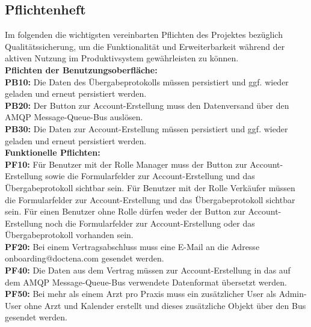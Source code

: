 \subsection{Pflichtenheft}
\label{sec:Pflichtenheft}
Im folgenden die wichtigsten vereinbarten Pflichten des Projektes bezüglich Qualitätssicherung, um die Funktionalität und Erweiterbarkeit während der aktiven Nutzung im Produktivsystem gewährleisten zu können.\\[1.5ex]
\textbf{Pflichten der Benutzungsoberfläche:}\\[1.5ex]
\textbf{PB10:} Die Daten des Übergabeprotokolls müssen persistiert und ggf. wieder geladen und erneut persistiert werden.\\
\textbf{PB20:} Der Button zur Account-Erstellung muss den Datenversand über den \ac{AMQP} Message-Queue-Bus auslösen.\\
\textbf{PB30:} Die Daten zur Account-Erstellung müssen persistiert und ggf. wieder geladen und erneut persistiert werden.\\[1.5ex]
\textbf{Funktionelle Pflichten:}\\[1.5ex]
\textbf{PF10:} Für Benutzer mit der Rolle Manager muss der Button zur Account-Erstellung sowie die Formularfelder zur Account-Erstellung und das Übergabeprotokoll sichtbar sein. Für Benutzer mit der Rolle Verkäufer müssen die Formularfelder zur Account-Erstellung und das Übergabeprotokoll sichtbar sein. Für einen Benutzer ohne Rolle dürfen weder der Button zur Account-Erstellung noch die Formularfelder zur Account-Erstellung oder das Übergabeprotokoll vorhanden sein.\\
\textbf{PF20:} Bei einem Vertragsabschluss muss eine E-Mail an die Adresse onboarding@doctena.com gesendet werden.\\
\textbf{PF40:} Die Daten aus dem Vertrag müssen zur Account-Erstellung in das auf dem \ac{AMQP} Message-Queue-Bus verwendete Datenformat übersetzt werden.\\
\textbf{PF50:} Bei mehr als einem Arzt pro Praxis muss ein zusätzlicher User als Admin-User ohne Arzt und Kalender erstellt und dieses zusätzliche Objekt über den Bus gesendet werden.\\

